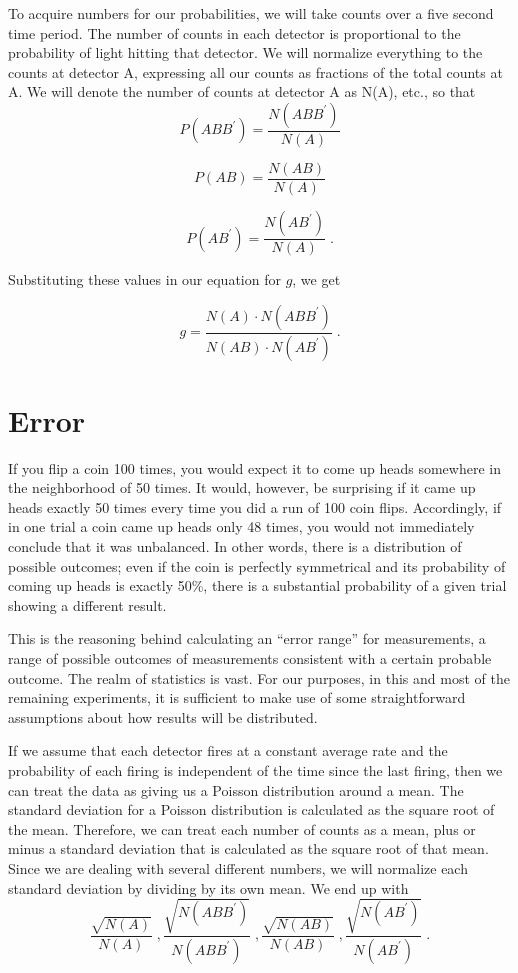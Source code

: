To acquire numbers for our probabilities, we will take counts over a five second time period.  The number of counts in each detector is proportional to the probability of light hitting that detector.  We will normalize everything to the counts at detector A, expressing all our counts as fractions of the total counts at A.  We will denote the number of counts at detector A as N(A), etc., so that
\[P(ABB^\prime) = \frac{N(ABB^\prime)}{N(A)} \]

 \[P(AB) = \frac{N(AB)}{N(A)} \]

\[P(AB^\prime) = \frac{N(AB^\prime)}{N(A)} \; . \]

\noindent Substituting these values in our equation for $g$, we get

\[g = \frac{N(A) \cdot N(ABB^\prime)}{N(AB) \cdot N(AB^\prime)} \; . \]

\section*{Error}

If you flip a coin 100 times, you would expect it to come up heads somewhere in the neighborhood of 50 times. It would, however, be surprising if it came up heads exactly 50 times every time you did a run of 100 coin flips. Accordingly, if in one trial a coin came up heads only 48 times, you would not immediately conclude that it was unbalanced. In other words, there is a distribution of possible outcomes; even if the coin is perfectly symmetrical and its probability of coming up heads is exactly 50\%, there is a substantial probability of a given trial showing a different result.

This is the reasoning behind calculating an ``error range'' for measurements, a range of possible outcomes of measurements consistent with a certain probable outcome. The realm of statistics is vast. For our purposes, in this and most of the remaining experiments, it is sufficient to make use of some straightforward assumptions about how results will be distributed.

If we assume that each detector fires at a constant average rate and the probability of each firing is independent of the time since the last firing, then we can treat the data as giving us a Poisson distribution around a mean.  The standard deviation for a Poisson distribution is calculated as the square root of the mean.  Therefore, we can treat each number of counts as a mean, plus or minus a standard deviation that is calculated as the square root of that mean.  Since we are dealing with several different numbers, we will normalize each standard deviation by dividing by its own mean.  We end up with
\[\frac{\sqrt{N(A)}}{N(A)}\;, \frac{\sqrt{N(ABB^\prime)}}{N(ABB^\prime)}\;, \frac{\sqrt{N(AB)}}{N(AB)}\;, \frac{\sqrt{N(AB^\prime)}}{N(AB^\prime)}\;.    \]

